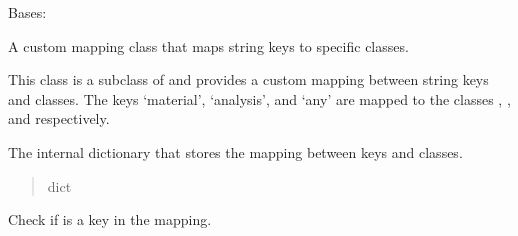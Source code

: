 \documentclass[letterpaper,10pt,english]{sphinxmanual}
\begin{document}
\begin{fulllineitems}
\label{\detokenize{forensicfit.database.database:forensicfit.database.database.ClassMap}}
\pysigstartsignatures
{}
\pysigstopsignatures
\sphinxAtStartPar
Bases: 

\sphinxAtStartPar
A custom mapping class that maps string keys to specific classes.

\sphinxAtStartPar
This class is a subclass of  and provides a custom mapping
between string keys and classes. The keys ‘material’, ‘analysis’, and ‘any’ are mapped
to the classes , , and  respectively.

\begin{fulllineitems}
\label{\detokenize{forensicfit.database.database:forensicfit.database.database.ClassMap.mapping}}
\pysigstartsignatures
{}
\pysigstopsignatures
\sphinxAtStartPar
The internal dictionary that stores the mapping between keys and classes.
\begin{quote}\begin{description}
\sphinxAtStartPar
dict

\end{description}\end{quote}

\end{fulllineitems}


\begin{fulllineitems}
\label{\detokenize{forensicfit.database.database:forensicfit.database.database.ClassMap.__contains__}}
\pysigstartsignatures
{}
\pysigstopsignatures
\sphinxAtStartPar
Check if  is a key in the mapping.


\end{fulllineitems}
\end{fulllineitems}
\end{document}
